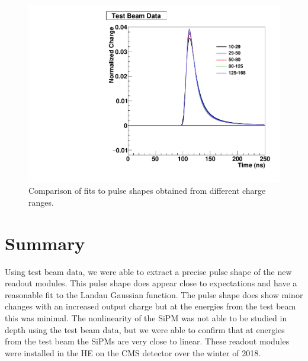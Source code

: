 \begin{figure}
\centering
\includegraphics[width=0.8\linewidth]{Figures/Overlap.pdf}
\caption{Comparison of fits to pulse shapes obtained from different charge ranges.}
\label{fig:Overlap}
\end{figure}


\section{Summary}

Using test beam data, we were able to extract a precise pulse shape of the new readout modules. This pulse shape does appear close to expectations and have a reasonable fit to the Landau Gaussian function. The pulse shape does show minor changes with an increased output charge but at the energies from the test beam this was minimal. The nonlinearity of the SiPM was not able to be studied in depth using the test beam data, but we were able to confirm that at energies from the test beam the SiPMs are very close to linear. These readout modules were installed in the HE on the CMS detector over the winter of 2018. 


